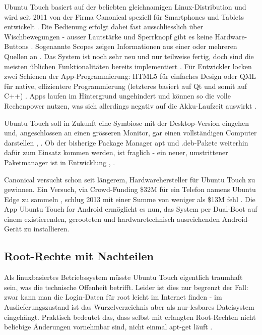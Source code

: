 Ubuntu Touch basiert auf der beliebten gleichnamigen Linux-Distribution und wird seit 2011 von der Firma Canonical speziell für Smartphones und Tablets entwickelt \cite{online:ubuntutouch-features}. Die Bedienung erfolgt dabei fast ausschliesslich über Wischbewegungen - ausser Lautstärke und Sperrknopf gibt es keine Hardware-Buttons \cite{online:ubuntutouch-blick}. Sogenannte Scopes zeigen Informationen aus einer oder mehreren Quellen an \cite{online:ubuntutouch-scopes}. Das System ist noch sehr neu und nur teilweise fertig, doch sind die meisten üblichen Funktionalitäten bereits implementiert \cite{online:ubuntutouch-blick}. Für Entwickler locken zwei Schienen der App-Programmierung: HTML5 für einfaches Design oder QML für native, effizientere Programmierung (letzteres basiert auf Qt und somit auf C++) \cite{online:ubuntutouch-developers}. Apps laufen im Hintergrund ungehindert und können so die volle Rechenpower nutzen, was sich allerdings negativ auf die Akku-Laufzeit auswirkt \cite{online:ubuntutouch-blick}.

Ubuntu Touch soll in Zukunft eine Symbiose mit der Desktop-Version eingehen und, angeschlossen an einen grösseren Monitor, gar einen vollständigen Computer darstellen \cite{online:ubuntutouch-advantages}, \cite{online:ubuntutouch-edge}. Ob der bisherige Package Manager apt und .deb-Pakete weiterhin dafür zum Einsatz kommen werden, ist fraglich - ein neuer, umstrittener Paketmanager ist in Entwicklung \cite{online:ubuntutouch-snappy}, \cite{online:ubuntutouch-snappytalk}.

Canonical versucht schon seit längerem, Hardwarehersteller für Ubuntu Touch zu gewinnen. Ein Versuch, via Crowd-Funding \$32M für ein Telefon namens Ubuntu Edge zu sammeln \cite{online:ubuntutouch-edge}, schlug 2013 mit einer Summe von weniger als \$13M fehl \cite{online:ubuntutouch-edgefail}. Die App Ubuntu Touch for Android ermöglicht es nun, das System per Dual-Boot auf einem existierenden, gerooteten und hardwaretechnisch ausreichenden Android-Gerät zu installieren.\\

\subsection{Root-Rechte mit Nachteilen}
Als linuxbasiertes Betriebssystem müsste Ubuntu Touch eigentlich traumhaft sein, was die technische Offenheit betrifft. Leider ist dies nur begrenzt der Fall: zwar kann man die Login-Daten für root leicht im Internet finden - im Auslieferungszustand ist das Wurzelverzeichnis aber als nur-lesbares Dateisystem eingehängt. Praktisch bedeutet das, dass selbst mit erlangten Root-Rechten nicht beliebige Änderungen vornehmbar sind, nicht einmal apt-get läuft \cite{online:ubuntutouch-aptget}.

